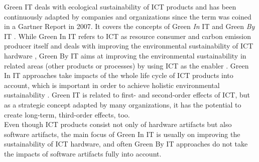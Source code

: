 \documentclass[oribibl]{llncs}
\begin{document}
Green IT deals with ecological sustainability of ICT products and has been continuously adapted by companies and organizations %
since the term was coined in a Gartner Report %
\cite{gartner07} in 2007. It covers the concepts of Green \textit{In} IT and Green \textit{By} IT \cite{hilty11}. While Green In IT refers to ICT as resource consumer and carbon emission producer itself and deals with improving the environmental sustainability of ICT hardware \cite{calero_green_2015}, Green By IT aims at improving the environmental sustainability in related areas (other products or processes) by using ICT as the enabler \cite{hilty11}. Green In IT approaches take impacts of the whole life cycle of ICT products into account, which is important in order to achieve holistic environmental sustainability \cite{hilty11}. Green IT is related to first- and second-order effects of ICT, but as a strategic concept adapted by many organizations, it has the potential to create long-term, third-order effects, too.\\
Even though ICT products consist not only of hardware artifacts but also software artifacts, the main focus of Green In IT is usually on improving the sustainability of ICT hardware, %
and often Green By IT approaches do not take the impacts of software artifacts fully into account. %
\end{document}
